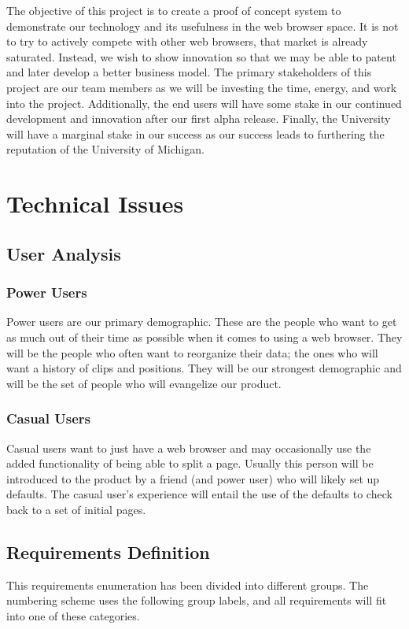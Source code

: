\documentclass[12pt]{article}
\begin{document}
The objective of this project is to create a proof of concept system to demonstrate our technology and its usefulness in the web browser space. It is not to try to actively compete with other web browsers, that market is already saturated. Instead, we wish to show innovation so that we may be able to patent and later develop a better business model. The primary stakeholders of this project are our team members as we will be investing the time, energy, and work into the project. Additionally, the end users will have some stake in our continued development and innovation after our first alpha release. Finally, the University will have a marginal stake in our success as our success leads to furthering the reputation of the University of Michigan.
\section{Technical Issues} %
\label{sec:technical_issues}
\subsection{User Analysis} %
\label{sub:user_analysis}
\subsubsection{Power Users} %
\label{ssub:power_users}
Power users are our primary demographic. These are the people who want to get as much out of their time as possible when it comes to using a web browser. They will be the people who often want to reorganize their data; the ones who will want a history of clips and positions. They will be our strongest demographic and will be the set of people who will evangelize our product.
\subsubsection{Casual Users} %
\label{ssub:casual_users}
Casual users want to just have a web browser and may occasionally use the added functionality of being able to split a page. Usually this person will be introduced to the product by a friend (and power user) who will likely set up defaults. The casual user's experience will entail the use of the defaults to check back to a set of initial pages.
\subsection{Requirements Definition} %
\label{sub:requirements_definition}
This requirements enumeration has been divided into different groups. The numbering scheme uses the following group labels, and all requirements will fit into one of these categories. \\
\end{document}
